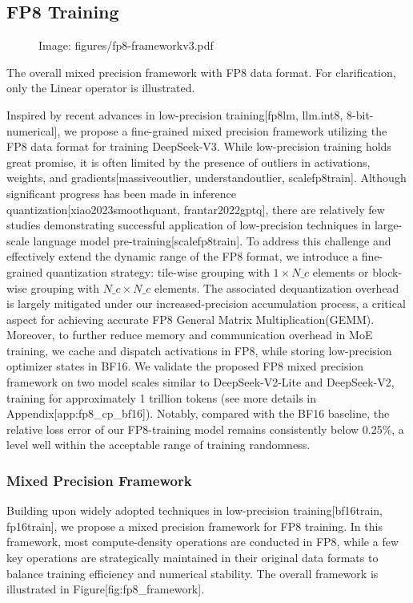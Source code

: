 \documentclass[11pt,a4paper]{article}
\begin{document}
\subsection{FP8 Training}

\begin{figure}[h]
\caption{Image: figures/fp8-frameworkv3.pdf}
\end{figure}

The overall mixed precision framework with FP8 data format. For clarification, only the Linear operator is illustrated.

Inspired by recent advances in low-precision training[fp8lm, llm.int8, 8-bit-numerical], we propose a fine-grained mixed precision framework utilizing the FP8 data format for training DeepSeek-V3. 
While low-precision training holds great promise, it is often limited by the presence of outliers in activations, weights, and gradients[massiveoutlier, understandoutlier, scalefp8train]. 
Although significant progress has been made in inference quantization[xiao2023smoothquant, frantar2022gptq], there are relatively few studies demonstrating successful application of low-precision techniques in large-scale language model pre-training[scalefp8train]. 
To address this challenge and effectively extend the dynamic range of the FP8 format, we introduce a fine-grained quantization strategy: tile-wise grouping with $1\times N\_c$ elements or block-wise grouping with $N\_c\times N\_c$ elements. 
The associated dequantization overhead is largely mitigated under our increased-precision accumulation process, a critical aspect for achieving accurate FP8 General Matrix Multiplication(GEMM). 
Moreover, to further reduce memory and communication overhead in MoE training, we cache and dispatch activations in FP8, while storing low-precision optimizer states in BF16. 
We validate the proposed FP8 mixed precision framework on two model scales similar to DeepSeek-V2-Lite and DeepSeek-V2, training for approximately 1 trillion tokens (see more details in Appendix[app:fp8\_cp\_bf16]). 
Notably, compared with the BF16 baseline, the relative loss error of our FP8-training model remains consistently below 0.25\%, a level well within the acceptable range of training randomness.

\subsubsection{Mixed Precision Framework}

Building upon widely adopted techniques in low-precision training[bf16train, fp16train], we propose a mixed precision framework for FP8 training. 
In this framework, most compute-density operations are conducted in FP8, while a few key operations are strategically maintained in their original data formats to balance training efficiency and numerical stability. 
The overall framework is illustrated in Figure[fig:fp8\_framework].
\end{document}
